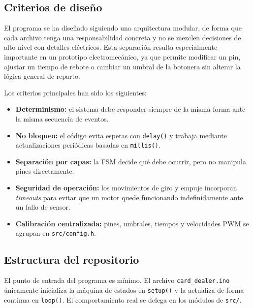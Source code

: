 \subsection{Criterios de diseño}

El programa se ha diseñado siguiendo una arquitectura modular, de forma que cada archivo tenga una responsabilidad concreta y no se mezclen decisiones de alto nivel con detalles eléctricos. Esta separación resulta especialmente importante en un prototipo electromecánico, ya que permite modificar un pin, ajustar un tiempo de rebote o cambiar un umbral de la botonera sin alterar la lógica general de reparto.

Los criterios principales han sido los siguientes:

\begin{itemize}
    \item \textbf{Determinismo:} el sistema debe responder siempre de la misma forma ante la misma secuencia de eventos.
    \item \textbf{No bloqueo:} el código evita esperas con \texttt{delay()} y trabaja mediante actualizaciones periódicas basadas en \texttt{millis()}.
    \item \textbf{Separación por capas:} la FSM decide qué debe ocurrir, pero no manipula pines directamente.
    \item \textbf{Seguridad de operación:} los movimientos de giro y empuje incorporan \textit{timeouts} para evitar que un motor quede funcionando indefinidamente ante un fallo de sensor.
    \item \textbf{Calibración centralizada:} pines, umbrales, tiempos y velocidades PWM se agrupan en \texttt{src/config.h}.
\end{itemize}

\subsection{Estructura del repositorio}

El punto de entrada del programa es mínimo. El archivo \texttt{card\_dealer.ino} únicamente inicializa la máquina de estados en \texttt{setup()} y la actualiza de forma continua en \texttt{loop()}. El comportamiento real se delega en los módulos de \texttt{src/}.

